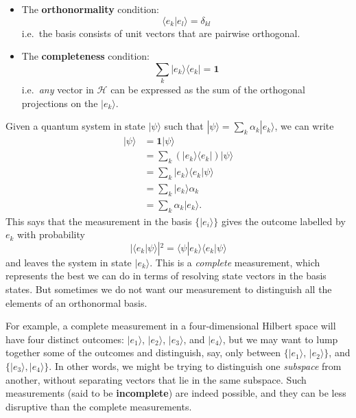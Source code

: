 \documentclass[fleqn]{article}
\providecommand{\tightlist}{%
  \setlength{\itemsep}{0pt}\setlength{\parskip}{0pt}}
\newenvironment{idea}{\noindent}{\medskip}
\begin{document}
\begin{idea}

\begin{itemize}
\tightlist
\item
  The \textbf{orthonormality} condition:
  \[
      \langle e_k|e_l\rangle = \delta_{kl}
    \]
  i.e.~the basis consists of unit vectors that are pairwise orthogonal.
\item
  The \textbf{completeness} condition:
  \[
      \sum_k|e_k\rangle\langle e_k| = \mathbf{1}
    \]
  i.e.~\emph{any} vector in \(\mathcal{H}\) can be expressed as the sum of the orthogonal projections on the \(|e_k\rangle\).
\end{itemize}


\end{idea}

Given a quantum system in state \(|\psi\rangle\) such that \(|\psi\rangle = \sum_k \alpha_k|e_k\rangle\), we can write
\[
  \begin{aligned}
    |\psi\rangle
    &= \mathbf{1}|\psi\rangle
  \\&= \sum_k (|e_k\rangle\langle e_k|) |\psi\rangle
  \\&= \sum_k |e_k\rangle\langle e_k|\psi\rangle
  \\&= \sum_k |e_k\rangle\alpha_k
  \\&= \sum_k \alpha_k|e_k\rangle.
  \end{aligned}
\]
This says that the measurement in the basis \(\{|e_i\rangle\}\) gives the outcome labelled by \(e_k\) with probability
\[
  |\langle e_k|\psi\rangle|^2 = \langle\psi|e_k\rangle\langle e_k|\psi\rangle
\]
and leaves the system in state \(|e_k\rangle\).
This is a \emph{complete} measurement, which represents the best we can do in terms of resolving state vectors in the basis states.
But sometimes we do not want our measurement to distinguish all the elements of an orthonormal basis.

For example, a complete measurement in a four-dimensional Hilbert space will have four distinct outcomes: \(|e_1\rangle\), \(|e_2\rangle\), \(|e_3\rangle\), and \(|e_4\rangle\), but we may want to lump together some of the outcomes and distinguish, say, only between \(\{|e_1\rangle\), \(|e_2\rangle\}\), and \(\{|e_3\rangle,|e_4\rangle\}\).
In other words, we might be trying to distinguish one \emph{subspace} from another, without separating vectors that lie in the same subspace.
Such measurements (said to be \textbf{incomplete}) are indeed possible, and they can be less disruptive than the complete measurements.
\end{document}
